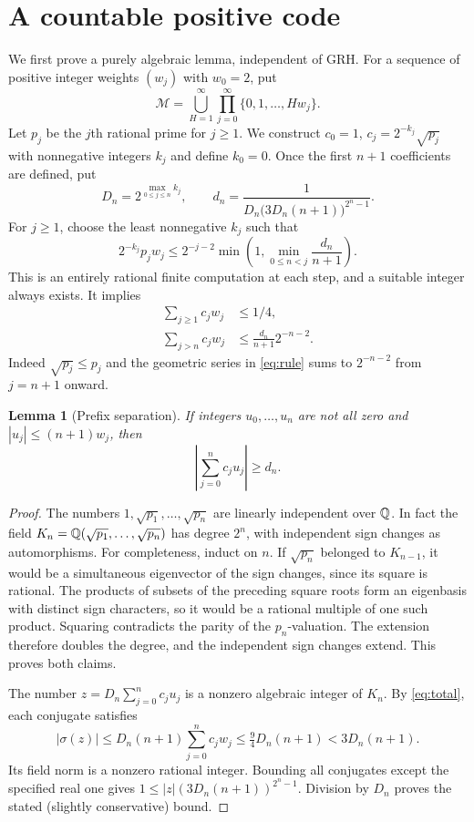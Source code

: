 \documentclass[11pt]{article}
\newtheorem{lemma}[theorem]{Lemma}
\theoremstyle{remark}\newtheorem{remark}[theorem]{Remark}
\begin{document}
\section{A countable positive code}\label{sec:code}
We first prove a purely algebraic lemma, independent of GRH. For a sequence of positive integer weights $(w_j)$ with $w_0=2$, put
\[
\mathcal M=\bigcup_{H=1}^\infty \prod_{j=0}^\infty \{0,1,\ldots,H w_j\}.
\]
Let $p_j$ be the $j$th rational prime for $j\ge1$. We construct $c_0=1$, $c_j=2^{-k_j}\sqrt{p_j}$ with nonnegative integers $k_j$ and define $k_0=0$. Once the first $n+1$ coefficients are defined, put
\begin{equation}\label{eq:delta}
D_n=2^{\max_{0\le j\le n} k_j},\qquad
 d_n=\frac1{D_n\bigl(3 D_n(n+1)\bigr)^{2^n-1}}.
\end{equation}
For $j\ge1$, choose the least nonnegative $k_j$ such that
\begin{equation}\label{eq:rule}
2^{-k_j}p_j w_j\le 2^{-j-2}
\min\left(1,\min_{0\le n<j}\frac{d_n}{n+1}\right).
\end{equation}
This is an entirely rational finite computation at each step, and a suitable integer always exists. It implies
\begin{align}
\sum_{j\ge1}c_jw_j&\le1/4,\label{eq:total}\\
\sum_{j>n}c_jw_j&\le\frac{d_n}{n+1}2^{-n-2}.
\label{eq:tail}
\end{align}
Indeed $\sqrt{p_j}\le p_j$ and the geometric series in \eqref{eq:rule} sums to $2^{-n-2}$ from $j=n+1$ onward.

\begin{lemma}[Prefix separation]\label{lem:sep}
If integers $u_0,\ldots,u_n$ are not all zero and $|u_j|\le(n+1)w_j$, then
\[
\left|\sum_{j=0}^n c_j u_j\right|\ge d_n.
\]
\end{lemma}
\begin{proof}
The numbers $1,\sqrt{p_1},\ldots,\sqrt{p_n}$ are linearly independent over $\mathbb Q$. In fact the field $K_n=\mathbb Q(\sqrt{p_1},\ldots,\sqrt{p_n})$ has degree $2^n$, with independent sign changes as automorphisms. For completeness, induct on $n$. If $\sqrt{p_n}$ belonged to $K_{n-1}$, it would be a simultaneous eigenvector of the sign changes, since its square is rational. The products of subsets of the preceding square roots form an eigenbasis with distinct sign characters, so it would be a rational multiple of one such product. Squaring contradicts the parity of the $p_n$-valuation. The extension therefore doubles the degree, and the independent sign changes extend. This proves both claims.

The number $z=D_n\sum_{j=0}^n c_j u_j$ is a nonzero algebraic integer of $K_n$. By \eqref{eq:total}, each conjugate satisfies
\[
|\sigma(z)|\le D_n(n+1)\sum_{j=0}^n c_jw_j
\le\tfrac94 D_n(n+1)<3 D_n(n+1).
\]
Its field norm is a nonzero rational integer. Bounding all conjugates except the specified real one gives $1\le|z|(3 D_n(n+1))^{2^n-1}$. Division by $D_n$ proves the stated (slightly conservative) bound.
\end{proof}
\end{document}
